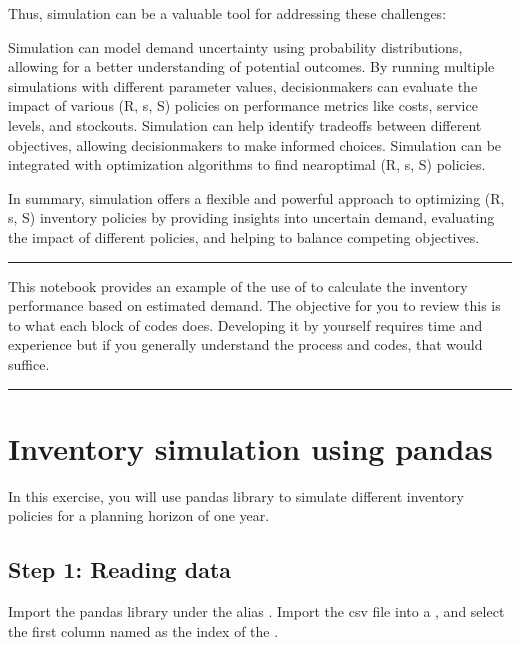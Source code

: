 \documentclass[letterpaper,10pt,english]{jupyterBook}
\begin{document}
\sphinxAtStartPar
Thus, simulation can be a valuable tool for addressing these challenges:

\sphinxAtStartPar
{} Simulation can model demand uncertainty using probability distributions, allowing for a better understanding of potential outcomes.
 By running multiple simulations with different parameter values, decision\sphinxhyphen{}makers can evaluate the impact of various (R, s, S) policies on performance metrics like costs, service levels, and stockouts.
 Simulation can help identify trade\sphinxhyphen{}offs between different objectives, allowing decision\sphinxhyphen{}makers to make informed choices.
 Simulation can be integrated with optimization algorithms to find near\sphinxhyphen{}optimal (R, s, S) policies.

\sphinxAtStartPar
In summary, simulation offers a flexible and powerful approach to optimizing (R, s, S) inventory policies by providing insights into uncertain demand, evaluating the impact of different policies, and helping to balance competing objectives.


\bigskip\hrule\bigskip


\sphinxAtStartPar
This notebook provides an example of the use of  to calculate the inventory performance based on estimated demand. The objective for you to review this is to  what each block of codes does. Developing it by yourself requires time and experience but if you generally understand the process and codes, that would suffice.


\bigskip\hrule\bigskip



\chapter{Inventory simulation using pandas}
\label{\detokenize{docs/Ex_Lecture_Demo_Inventory_Sim:inventory-simulation-using-pandas}}
\sphinxAtStartPar
In this exercise, you will use pandas library to simulate different inventory policies for a planning horizon of one year.


\section{Step 1: Reading data}
\label{\detokenize{docs/Ex_Lecture_Demo_Inventory_Sim:step-1-reading-data}}
\sphinxAtStartPar
Import the pandas library under the alias . Import the csv file  into a , and select the first column named  as the index of the .
\end{document}
